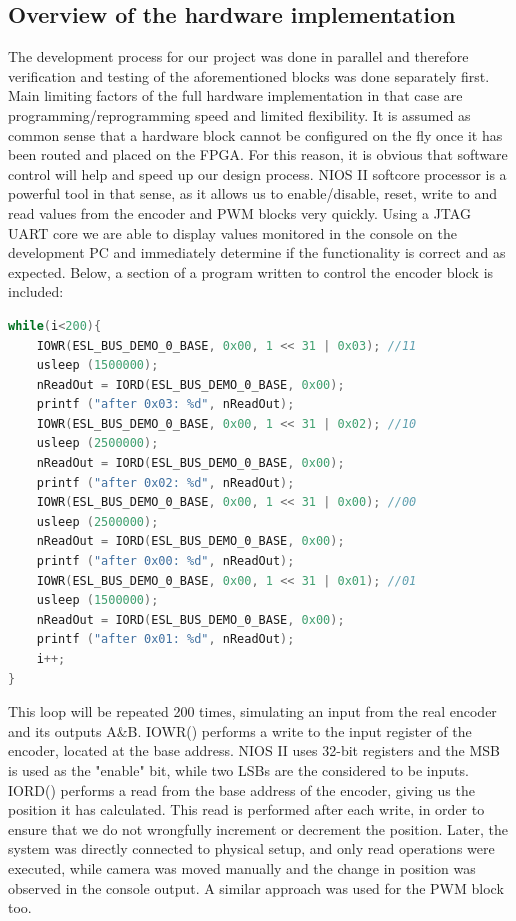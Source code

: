 \subsection{Overview of the hardware implementation}
The development process for our project was done in parallel and therefore verification and testing of the aforementioned blocks was done separately first. Main limiting factors of the full hardware implementation in that case are programming/reprogramming speed and limited flexibility. It is assumed as common sense that a hardware block cannot be configured on the fly once it has been routed and placed on the FPGA. For this reason, it is obvious that software control will help and speed up our design process. NIOS II softcore processor is a powerful tool in that sense, as it allows us to enable/disable, reset, write to and read values from the encoder and PWM blocks very quickly. Using a JTAG UART core we are able to display values monitored in the console on the development PC and immediately determine if the functionality is correct and as expected. Below, a section of a program written to control the encoder block is included:

\begin{lstlisting}[language=C]
while(i<200){
	IOWR(ESL_BUS_DEMO_0_BASE, 0x00, 1 << 31 | 0x03); //11
	usleep (1500000);
	nReadOut = IORD(ESL_BUS_DEMO_0_BASE, 0x00);
	printf ("after 0x03: %d", nReadOut);
	IOWR(ESL_BUS_DEMO_0_BASE, 0x00, 1 << 31 | 0x02); //10
	usleep (2500000);
	nReadOut = IORD(ESL_BUS_DEMO_0_BASE, 0x00);
	printf ("after 0x02: %d", nReadOut);
	IOWR(ESL_BUS_DEMO_0_BASE, 0x00, 1 << 31 | 0x00); //00
	usleep (2500000);
	nReadOut = IORD(ESL_BUS_DEMO_0_BASE, 0x00);
	printf ("after 0x00: %d", nReadOut);
	IOWR(ESL_BUS_DEMO_0_BASE, 0x00, 1 << 31 | 0x01); //01
	usleep (1500000);
	nReadOut = IORD(ESL_BUS_DEMO_0_BASE, 0x00);
	printf ("after 0x01: %d", nReadOut);
	i++;
}
\end{lstlisting}

This loop will be repeated 200 times, simulating an input from the real encoder and its outputs A&B. IOWR() performs a write to the input register of the encoder, located at the base address. NIOS II uses 32-bit registers and the MSB is used as the "enable" bit, while two LSBs are the considered to be inputs. IORD() performs a read from the base address of the encoder, giving us the position it has calculated. This read is performed after each write, in order to ensure that we do not wrongfully increment or decrement the position. Later, the system was directly connected to physical setup, and only read operations were executed, while camera was moved manually and the change in position was observed in the console output. A similar approach was used for the PWM block too.\\

